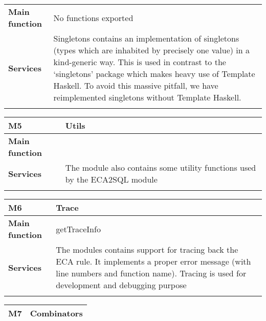 \documentclass[12pt, svgnames]{article}
\begin{document}
{{{{\begin{tabularx}{\textwidth}{>{\bfseries}m{4cm}X}
        Main function  &  No functions exported
        \\	Services &  Singletons contains an implementation of singletons (types which are inhabited by precisely one value)
  in a kind-generic way. This is used in contrast to the `singletons' package which makes heavy use of 
  Template Haskell. To avoid this massive pitfall, we have reimplemented singletons without Template Haskell.
        \\       
        \vspace{12pt}
    \end{tabularx}\vspace{3em}
{\setlength{\tabcolsep}{6pt} 
    \begin{tabularx}{\textwidth}{>{\bfseries}m{4cm}X}
        M5 & Utils \\ 
        \midrule
        
        Main function  & 
        \\	Services &  The module also contains some utility functions used by the ECA2SQL module
        \\       
        \vspace{12pt}
    \end{tabularx}\vspace{3em}
{\setlength{\tabcolsep}{6pt} 
    \begin{tabularx}{\textwidth}{>{\bfseries}m{4cm}X}
        M6 & Trace \\ 
        \midrule
        
        Main function  &  getTraceInfo 
        \\	Services &  The modules contains support for tracing back the ECA rule. It implements a proper error message (with line numbers and function name). Tracing is used for development and debugging purpose
        \\       
        \vspace{12pt}
    \end{tabularx}\vspace{3em}
{\setlength{\tabcolsep}{6pt} 
    \begin{tabularx}{\textwidth}{>{\bfseries}m{5cm}X}
        M7 & Combinators \\ 
        \midrule
        

\end{tabularx}}}}}}}}
\end{document}
